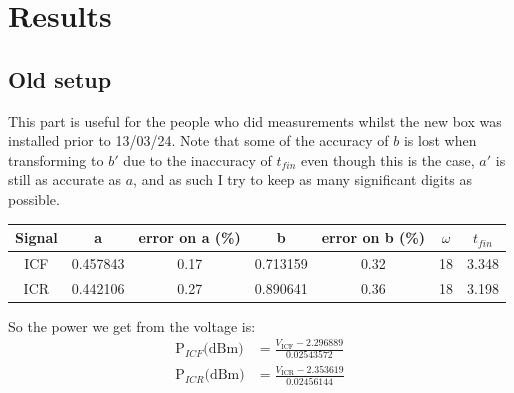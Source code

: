 \documentclass{report}
\begin{document}
\section{Results}
\subsection{Old setup}
This part is useful for the people who did measurements whilst the
new box was installed prior to 13/03/24. Note that some of the
accuracy of $b$ is lost when transforming to $b'$ due to the
inaccuracy of $t_{fin}$ even though this is the case, $a'$ is still
as accurate as $a$, and as such I try to keep as many significant
digits as possible.
\begin{center}
\begin{tabular}{||c c c c c c c||}
 \hline
 Signal & a & error on a (\%) & b & error on b (\%) & $\omega$ & $t_{fin}$\\ [0.5ex]
 \hline\hline
 ICF & 0.457843 & 0.17 & 0.713159 & 0.32 & 18 & 3.348\\
 ICR & 0.442106 & 0.27 & 0.890641 & 0.36 & 18 & 3.198\\
 \hline
\end{tabular}
\end{center}
So the power we get from the voltage is:
\begin{eqnarray}
    \text{P}_{ICF}\text{(dBm)} &= \frac{V_{\text{ICF}}-2.296889}{0.02543572}\\
    \text{P}_{ICR}\text{(dBm)} &= \frac{V_{\text{ICR}}-2.353619}{0.02456144}
\end{eqnarray}
\end{document}
